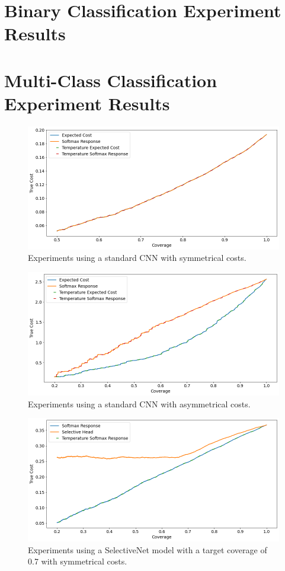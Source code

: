 \section{Binary Classification Experiment Results}


\section{Multi-Class Classification Experiment Results}
\begin{figure}[h]
	\includegraphics[width=\textwidth]{images/multi-class/cnn-sym.png}
	\caption{Experiments using a standard CNN with symmetrical costs.}
\end{figure}

\begin{figure}[h]
	\includegraphics[width=\textwidth]{images/multi-class/cnn-asym.png}
	\caption{Experiments using a standard CNN with asymmetrical costs.}
\end{figure}

\begin{figure}[h]
	\includegraphics[width=\textwidth]{images/multi-class/sn0.7-sym.png}
	\caption{Experiments using a SelectiveNet model with a target coverage of 0.7 with symmetrical costs.}
\end{figure}

